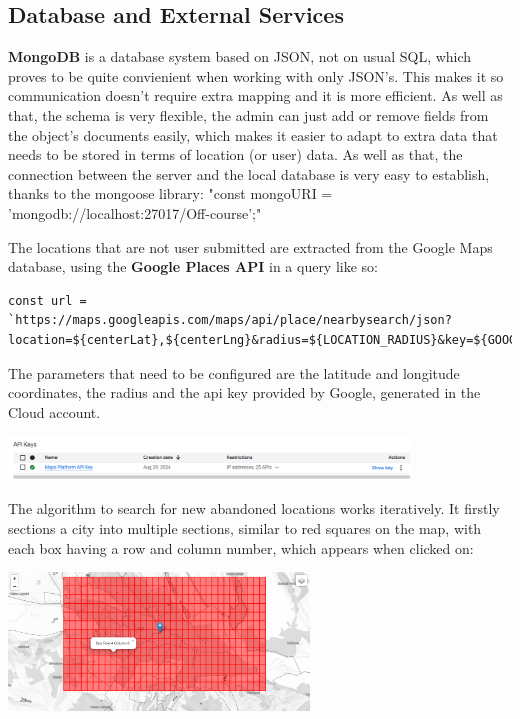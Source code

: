 \documentclass[12pt,a4paper]{report}
\begin{document}
\subsection{Database and External Services}

\textbf{MongoDB} is a database system based on JSON, not on usual SQL, which proves to be quite convienient when working with only JSON's. This makes it so communication doesn't require extra mapping and it is more efficient. As well as that, the schema is very flexible, the admin can just add or remove fields from the object's documents easily, which makes it easier to adapt to extra data that needs to be stored in terms of location (or user) data. As well as that, the connection between the server and the local database is very easy to establish, thanks to the mongoose library: "const mongoURI = 'mongodb://localhost:27017/Off-course';"

The locations that are not user submitted are extracted from the Google Maps database, using the \textbf{Google Places API} in a query like so:

\begin{lstlisting}
const url = `https://maps.googleapis.com/maps/api/place/nearbysearch/json?location=${centerLat},${centerLng}&radius=${LOCATION_RADIUS}&key=${GOOGLE_MAPS_API_KEY}`;
\end{lstlisting}

The parameters that need to be configured are the latitude and longitude coordinates, the radius and the api key provided by Google, generated in the Cloud account.

\begin{center}
\includegraphics[width=0.8\textwidth]{images/google.png}
\end{center}

The algorithm to search for new abandoned locations works iteratively. It firstly sections a city into multiple sections, similar to red squares on the map, with each box having a row and column number, which appears when clicked on:

\begin{center}
\includegraphics[width=0.6\textwidth]{images/grid.png}
\end{center}
\end{document}
